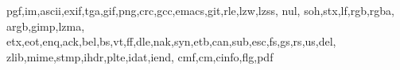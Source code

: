 \newcommand{\charnodeoffset}{1.0cm}

\newcommand{\nodechar}[2]{\node[below=of #1, yshift=\charnodeoffset] {\texttt{#2}};}

\newcommand{\firstcharnode}[3]{  \node (#1) [hnode] {#2};
  \nodechar{#1}{\texttt{#3}}}

\newcommand{\restcharnode}[4]{
  \node (#1) [hnode,right=of #2] {#3};
  \nodechar{#1}{\texttt{#4}}
}

\newcommand*\algohack{\addtocontents{loa}{\vskip 9pt}}


\newcommand*\acronymstyle{\scshape}
\newcommand*\newacronym[1]{
  \expandafter\newcommand\csname#1\endcsname[1][]{{\acronymstyle#1}##1\xspace}}

\newcommand*{\newacronyms}{%
  \let\do\newacronym
  \docsvlist
}
\newacronyms{pgf,im,ascii,exif,tga,gif,png,crc,gcc,emacs,git,rle,lzw,lzss,
nul, soh,stx,lf,rgb,rgba, argb,gimp,lzma,
etx,eot,enq,ack,bel,bs,vt,ff,dle,nak,syn,etb,can,sub,esc,fs,gs,rs,us,del,
zlib,mime,stmp,ihdr,plte,idat,iend,
cmf,cm,cinfo,flg,pdf}

\newcommand*{\lzone}{{\acronymstyle lz\oldstylenums{77}}\xspace}
\newcommand*{\lztwo}{{\acronymstyle lz\oldstylenums{78}}\xspace}

\newcommand*{\cret}{{\acronymstyle cr}\xspace}
\newcommand*{\htab}{{\acronymstyle ht}\xspace}
\newcommand*{\nullm}{{\acronymstyle null}\xspace}
\newcommand*{\lzfam}{{\acronymstyle lz}-family\xspace}
\newcommand*{\sout}{{\acronymstyle so}\xspace}
\newcommand*{\shiftin}{{\acronymstyle si}\xspace}
\newcommand*{\emed}{{\acronymstyle em}\xspace}

\newcommand*{\crlf}{{\acronymstyle crlf}\xspace}


\newcommand*{\dc}[1]{{\acronymstyle dc#1}\xspace}

\newcommand*{\crcst}{{\acronymstyle crc-16}\xspace}

\newcommand{\deflate}{Deflate\xspace}

\newenvironment{samepagew}{\begin{minipage}{\textwidth}}{\end{minipage}}


